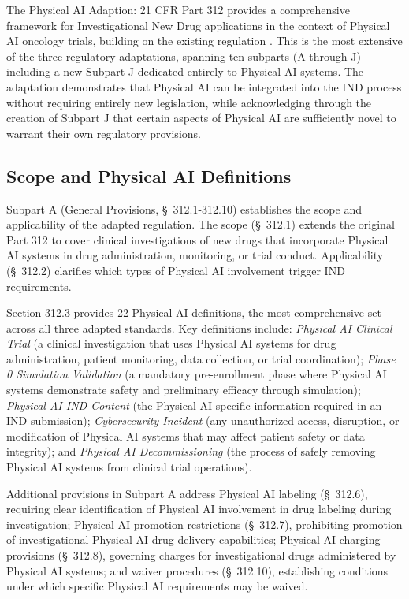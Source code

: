 
The Physical AI Adaption: 21 CFR Part 312 \cite{cfr312-adapt} provides a
comprehensive framework for Investigational New Drug applications in the context
of Physical AI oncology trials, building on the existing regulation
\cite{cfr-part-312}. This is the most extensive of the three regulatory
adaptations, spanning ten subparts (A through J) including a new Subpart J
dedicated entirely to Physical AI systems. The adaptation demonstrates that
Physical AI can be integrated into the IND process without requiring entirely
new legislation, while acknowledging through the creation of Subpart J that
certain aspects of Physical AI are sufficiently novel to warrant their own
regulatory provisions.

\subsection{Scope and Physical AI Definitions}
\label{subsec:cfr312-scope}

Subpart A (General Provisions, \S~312.1-312.10) establishes the scope and
applicability of the adapted regulation. The scope (\S~312.1) extends the
original Part 312 to cover clinical investigations of new drugs that
incorporate Physical AI systems in drug administration, monitoring, or trial
conduct. Applicability (\S~312.2) clarifies which types of Physical AI
involvement trigger IND requirements.

Section 312.3 provides 22 Physical AI definitions, the most comprehensive set
across all three adapted standards. Key definitions include: \textit{Physical
AI Clinical Trial} (a clinical investigation that uses Physical AI systems for
drug administration, patient monitoring, data collection, or trial
coordination); \textit{Phase 0 Simulation Validation} (a mandatory
pre-enrollment phase where Physical AI systems demonstrate safety and
preliminary efficacy through simulation); \textit{Physical AI IND Content} (the
Physical AI-specific information required in an IND submission);
\textit{Cybersecurity Incident} (any unauthorized access, disruption, or
modification of Physical AI systems that may affect patient safety or data
integrity); and \textit{Physical AI Decommissioning} (the process of safely
removing Physical AI systems from clinical trial operations).

Additional provisions in Subpart A address Physical AI labeling (\S~312.6),
requiring clear identification of Physical AI involvement in drug labeling
during investigation; Physical AI promotion restrictions (\S~312.7),
prohibiting promotion of investigational Physical AI drug delivery capabilities;
Physical AI charging provisions (\S~312.8), governing charges for
investigational drugs administered by Physical AI systems; and waiver
procedures (\S~312.10), establishing conditions under which specific Physical
AI requirements may be waived.

